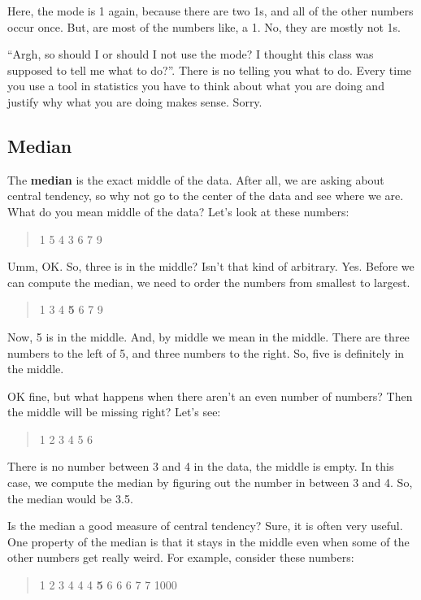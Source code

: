 \documentclass[
]{book}
\begin{document}
Here, the mode is 1 again, because there are two 1s, and all of the other numbers occur once. But, are most of the numbers like, a 1. No, they are mostly not 1s.

``Argh, so should I or should I not use the mode? I thought this class was supposed to tell me what to do?''. There is no telling you what to do. Every time you use a tool in statistics you have to think about what you are doing and justify why what you are doing makes sense. Sorry.

\subsection{Median}\label{median}

The \textbf{median} is the exact middle of the data. After all, we are asking about central tendency, so why not go to the center of the data and see where we are. What do you mean middle of the data? Let's look at these numbers:

\begin{quote}
1 5 4 3 6 7 9
\end{quote}

Umm, OK. So, three is in the middle? Isn't that kind of arbitrary. Yes. Before we can compute the median, we need to order the numbers from smallest to largest.

\begin{quote}
1 3 4 \textbf{5} 6 7 9
\end{quote}

Now, 5 is in the middle. And, by middle we mean in the middle. There are three numbers to the left of 5, and three numbers to the right. So, five is definitely in the middle.

OK fine, but what happens when there aren't an even number of numbers? Then the middle will be missing right? Let's see:

\begin{quote}
1 2 3 4 5 6
\end{quote}

There is no number between 3 and 4 in the data, the middle is empty. In this case, we compute the median by figuring out the number in between 3 and 4. So, the median would be 3.5.

Is the median a good measure of central tendency? Sure, it is often very useful. One property of the median is that it stays in the middle even when some of the other numbers get really weird. For example, consider these numbers:

\begin{quote}
1 2 3 4 4 4 \textbf{5} 6 6 6 7 7 1000
\end{quote}
\end{document}
